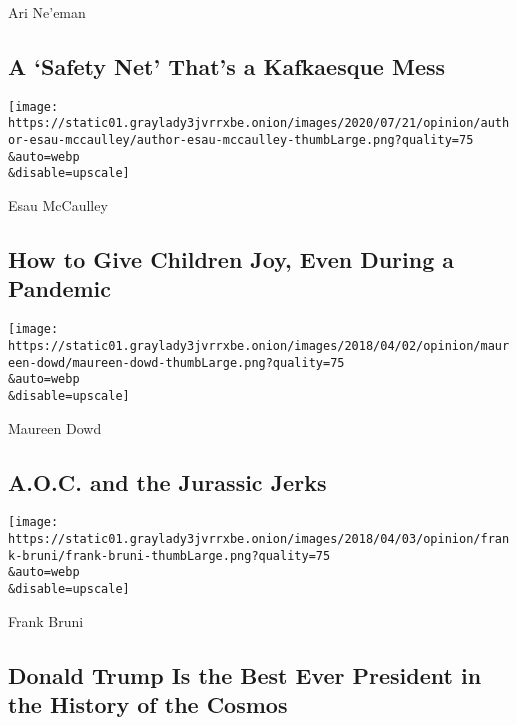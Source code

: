 \href{/2020/07/25/opinion/a-safety-net-thats-a-kafkaesque-mess.html}{}

Ari Ne'eman

\hypertarget{a-safety-net-thats-a-kafkaesque-mess}{%
\subsection{A `Safety Net' That's a Kafkaesque
Mess}\label{a-safety-net-thats-a-kafkaesque-mess}}

\href{/2020/07/23/opinion/sunday/coronavirus-parenting-joy.html}{}

\texttt{[image: https://static01.graylady3jvrrxbe.onion/images/2020/07/21/opinion/author-esau-mccaulley/author-esau-mccaulley-thumbLarge.png?quality=75\\\&auto=webp\\\&disable=upscale]}

Esau McCaulley

\hypertarget{how-to-give-children-joy-even-during-a-pandemic}{%
\subsection{How to Give Children Joy, Even During a
Pandemic}\label{how-to-give-children-joy-even-during-a-pandemic}}

\href{/2020/07/25/opinion/sunday/aoc-yoho-trump-2020.html}{}

\texttt{[image: https://static01.graylady3jvrrxbe.onion/images/2018/04/02/opinion/maureen-dowd/maureen-dowd-thumbLarge.png?quality=75\\\&auto=webp\\\&disable=upscale]}

Maureen Dowd

\hypertarget{aoc-and-the-jurassic-jerks}{%
\subsection{A.O.C. and the Jurassic
Jerks}\label{aoc-and-the-jurassic-jerks}}

\href{/2020/07/25/opinion/sunday/trump-lies.html}{}

\texttt{[image: https://static01.graylady3jvrrxbe.onion/images/2018/04/03/opinion/frank-bruni/frank-bruni-thumbLarge.png?quality=75\\\&auto=webp\\\&disable=upscale]}

Frank Bruni

\hypertarget{donald-trump-is-the-best-ever-president-in-the-history-of-the-cosmos}{%
\subsection{Donald Trump Is the Best Ever President in the History of
the
Cosmos}\label{donald-trump-is-the-best-ever-president-in-the-history-of-the-cosmos}}

